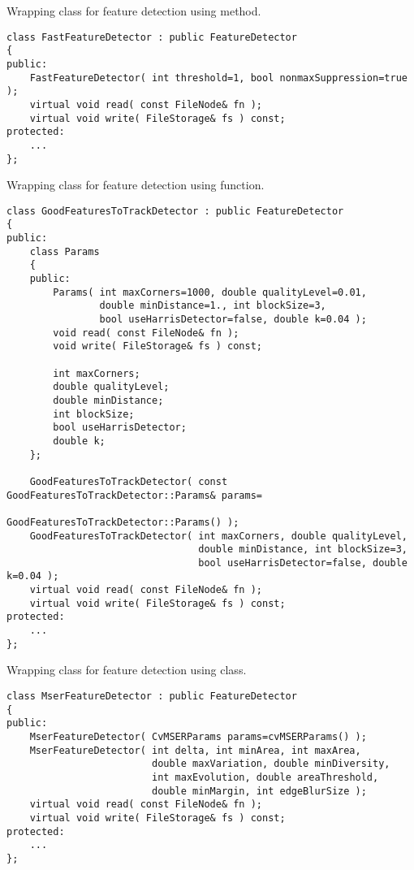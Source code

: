 Wrapping class for feature detection using  method.

\begin{lstlisting}
class FastFeatureDetector : public FeatureDetector
{
public:
    FastFeatureDetector( int threshold=1, bool nonmaxSuppression=true );
    virtual void read( const FileNode& fn );
    virtual void write( FileStorage& fs ) const;
protected:
    ...
};
\end{lstlisting}

Wrapping class for feature detection using  function.

\begin{lstlisting}
class GoodFeaturesToTrackDetector : public FeatureDetector
{
public:
    class Params
    {
    public:
        Params( int maxCorners=1000, double qualityLevel=0.01, 
                double minDistance=1., int blockSize=3, 
                bool useHarrisDetector=false, double k=0.04 );
        void read( const FileNode& fn );
        void write( FileStorage& fs ) const;

        int maxCorners;
        double qualityLevel;
        double minDistance;
        int blockSize;
        bool useHarrisDetector;
        double k;
    };

    GoodFeaturesToTrackDetector( const GoodFeaturesToTrackDetector::Params& params=
                                            GoodFeaturesToTrackDetector::Params() );
    GoodFeaturesToTrackDetector( int maxCorners, double qualityLevel, 
                                 double minDistance, int blockSize=3, 
                                 bool useHarrisDetector=false, double k=0.04 );
    virtual void read( const FileNode& fn );
    virtual void write( FileStorage& fs ) const;
protected:
    ...
};
\end{lstlisting}

Wrapping class for feature detection using  class.

\begin{lstlisting}
class MserFeatureDetector : public FeatureDetector
{
public:
    MserFeatureDetector( CvMSERParams params=cvMSERParams() );
    MserFeatureDetector( int delta, int minArea, int maxArea, 
                         double maxVariation, double minDiversity,
                         int maxEvolution, double areaThreshold, 
                         double minMargin, int edgeBlurSize );
    virtual void read( const FileNode& fn );
    virtual void write( FileStorage& fs ) const;
protected:
    ...
};
\end{lstlisting}

